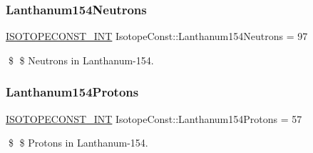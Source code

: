 \subsubsection{\texorpdfstring{Lanthanum154\+Neutrons}{Lanthanum154Neutrons}}
{\footnotesize\ttfamily \mbox{\hyperlink{group___isotope_const-_macros_ga5f18360b3e99483a35c32d789e62621c}{I\+S\+O\+T\+O\+P\+E\+C\+O\+N\+S\+T\+\_\+\+I\+NT}} Isotope\+Const\+::\+Lanthanum154\+Neutrons = 97}

\$ \$ Neutrons in Lanthanum-\/154. \mbox{\label{group___isotope_const-_lanthanum-_la154_gac614b1a36d462a92b4bffdd9ca9f7b35}} 
\subsubsection{\texorpdfstring{Lanthanum154\+Protons}{Lanthanum154Protons}}
{\footnotesize\ttfamily \mbox{\hyperlink{group___isotope_const-_macros_ga5f18360b3e99483a35c32d789e62621c}{I\+S\+O\+T\+O\+P\+E\+C\+O\+N\+S\+T\+\_\+\+I\+NT}} Isotope\+Const\+::\+Lanthanum154\+Protons = 57}

\$ \$ Protons in Lanthanum-\/154. 